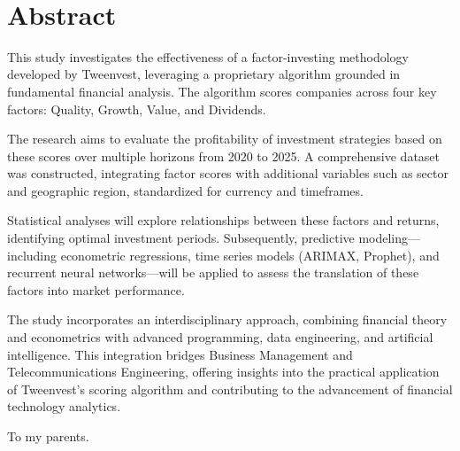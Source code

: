 \documentclass[11pt,english,a4paper,hidelinks]{book}
\begin{document}
\renewcommand{\listtablename}{List of Tables} 
\renewcommand{\tablename}{Table} 

 

\newpage
\thispagestyle{empty}\ \\
\newpage
\thispagestyle{empty}

\section*{Abstract}
\noindent This study investigates the effectiveness of a factor-investing methodology developed by Tweenvest, leveraging a proprietary algorithm grounded in fundamental financial analysis. The algorithm scores companies across four key factors: Quality, Growth, Value, and Dividends.

\vspace{0.5cm}

\noindent The research aims to evaluate the profitability of investment strategies based on these scores over multiple horizons from 2020 to 2025. A comprehensive dataset was constructed, integrating factor scores with additional variables such as sector and geographic region, standardized for currency and timeframes.

\vspace{0.5cm}

\noindent Statistical analyses will explore relationships between these factors and returns, identifying optimal investment periods. Subsequently, predictive modeling—including econometric regressions, time series models (ARIMAX, Prophet), and recurrent neural networks—will be applied to assess the translation of these factors into market performance.

\vspace{0.5cm}

\noindent The study incorporates an interdisciplinary approach, combining financial theory and econometrics with advanced programming, data engineering, and artificial intelligence. This integration bridges Business Management and Telecommunications Engineering, offering insights into the practical application of Tweenvest's scoring algorithm and contributing to the advancement of financial technology analytics.

\newpage
\thispagestyle{empty}
\vfill
\begin{flushright}
To my parents.
\end{flushright}
\vfill\vfill

\newpage
\thispagestyle{empty}
\ \\
\tableofcontents
\newpage
\end{document}
